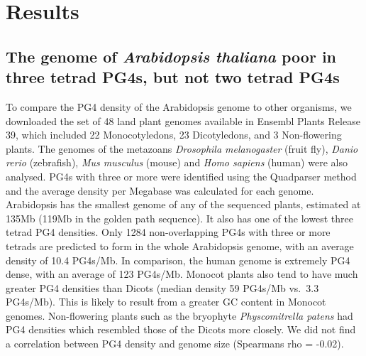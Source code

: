 \documentclass[12pt,a4paper,]{report}
\begin{document}
\newpage

\hypertarget{results}{%
\section{Results}\label{results}}

\hypertarget{the-genome-of-arabidopsis-thaliana-poor-in-three-tetrad-pg4s-but-not-two-tetrad-pg4s}{%
\subsection{\texorpdfstring{The genome of \emph{Arabidopsis thaliana}
poor in three tetrad PG4s, but not two tetrad
PG4s}{The genome of Arabidopsis thaliana poor in three tetrad PG4s, but not two tetrad PG4s}}\label{the-genome-of-arabidopsis-thaliana-poor-in-three-tetrad-pg4s-but-not-two-tetrad-pg4s}}

To compare the PG4 density of the Arabidopsis genome to other organisms,
we downloaded the set of 48 land plant genomes available in Ensembl
Plants Release 39, which included 22 Monocotyledons, 23 Dicotyledons,
and 3 Non-flowering plants. The genomes of the metazoans
\emph{Drosophila melanogaster} (fruit fly), \emph{Danio rerio}
(zebrafish), \emph{Mus musculus} (mouse) and \emph{Homo sapiens} (human)
were also analysed. PG4s with three or more were identified using the
Quadparser method and the average density per Megabase was calculated
for each genome. Arabidopsis has the smallest genome of any of the
sequenced plants, estimated at 135Mb (119Mb in the golden path
sequence). It also has one of the lowest three tetrad PG4 densities.
Only 1284 non-overlapping PG4s with three or more tetrads are predicted
to form in the whole Arabidopsis genome, with an average density of 10.4
PG4s/Mb. In comparison, the human genome is extremely PG4 dense, with an
average of 123 PG4s/Mb. Monocot plants also tend to have much greater
PG4 densities than Dicots (median density 59 PG4s/Mb vs.~3.3 PG4s/Mb).
This is likely to result from a greater GC content in Monocot genomes.
Non-flowering plants such as the bryophyte \emph{Physcomitrella patens}
had PG4 densities which resembled those of the Dicots more closely. We
did not find a correlation between PG4 density and genome size
(Spearmans rho = -0.02).
\end{document}
